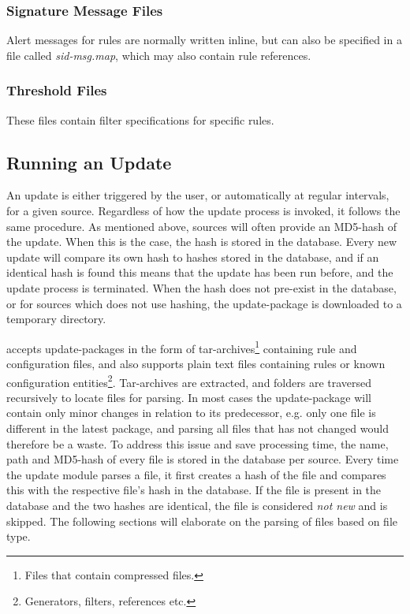 \subsubsection{Signature Message Files}
Alert messages for rules are normally written inline, but can also be specified
in a file called {\em sid-msg.map}, which may also contain rule references.

\subsubsection{Threshold Files}
These files contain filter specifications for specific rules.

\subsection{Running an Update}
An update is either triggered by the user, or automatically at regular
intervals, for a given source. Regardless of how the update process is invoked,
it follows the same procedure. As mentioned above, sources will often provide an
MD5-hash of the update. When this is the case, the hash is stored in the
database. Every new update will compare its own hash to hashes stored in the
database, and if an identical hash is found this means that the update has been
run before, and the update process is terminated. When the hash does not
pre-exist in the database, or for sources which does not use hashing, the
update-package is downloaded to a temporary directory.

\snowman{} accepts update-packages in the form of tar-archives\footnote{Files
that contain compressed files.} containing rule and configuration files, and
also supports plain text files containing rules or known configuration
entities\footnote{Generators, filters, references etc.}. Tar-archives are
extracted, and folders are traversed recursively to locate files for
parsing. In most cases the update-package will contain only minor
changes in relation to its predecessor, e.g. only one file is different in the
latest package, and parsing all files that has not changed would therefore be
a waste. To address this issue and save processing time, the name, path and
MD5-hash of every file is stored in the database per source. Every time the
update module parses a file, it first creates a hash of the file and
compares this with the respective file's hash in the database. If the file
is present in the database and the two hashes are identical, the file is
considered {\em not new} and is skipped. The following sections will
elaborate on the parsing of files based on file type.

